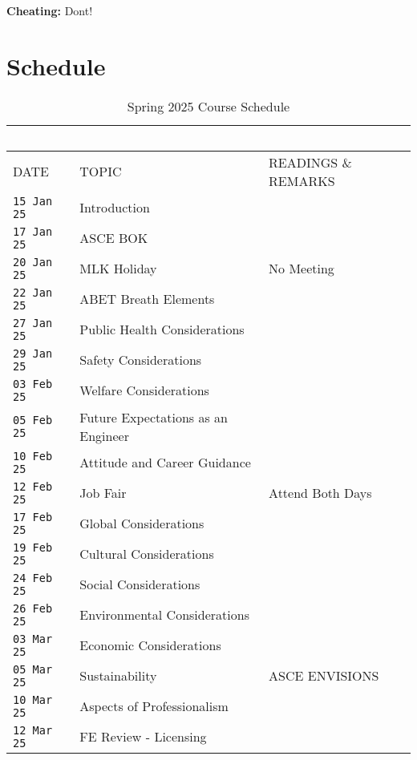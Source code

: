 \documentclass[12pt]{article}
\begin{document}
\textbf{Cheating:} Dont!


\clearpage
\section*{Schedule}
\begin{table}[ht!]
   \centering
   \caption{Spring 2025 Course Schedule}
   \begin{tabular}{p{1.0in}p{2.5in}p{3.0in}} 
   ~ & ~ & ~  \\
\hline
DATE & TOPIC & READINGS \& REMARKS  \\
\hline
\texttt{15 Jan 25} & Introduction &   \\ %
\texttt{17 Jan 25} & ASCE BOK &  \cite{ASCE2019}\\ %
\texttt{20 Jan 25} & MLK Holiday & No Meeting \\%
\texttt{22 Jan 25} & ABET Breath Elements & \cite{ASCE2019} \\%
\texttt{27 Jan 25} & Public Health Considerations &  \cite{ASCE2019} \\ %
\texttt{29 Jan 25} & Safety Considerations &  \cite{ASCE2019} \\ %
\texttt{03 Feb 25} & Welfare Considerations &  \cite{ASCE2019} \\ %
\texttt{05 Feb 25} & Future Expectations as an Engineer & \\ %
\texttt{10 Feb 25} & Attitude and Career Guidance &  \cite{Attitude2024} \\ %
\texttt{12 Feb 25} & Job Fair &  Attend Both Days \\ %
\texttt{17 Feb 25} & Global Considerations &  \cite{ASCE2019} \\ %
\texttt{19 Feb 25} & Cultural Considerations &  \cite{ASCE2019} \\ %
\texttt{24 Feb 25} & Social Considerations &  \cite{ASCE2019} \\ %
\texttt{26 Feb 25} & Environmental Considerations &  \cite{ASCE2019} \\ %
\texttt{03 Mar 25} & Economic Considerations &  \cite{ASCE2019} \\ %
\texttt{05 Mar 25} & Sustainability & ASCE ENVISIONS \cite{ASCE2019} \\ %
\hline
\texttt{10 Mar 25} & Aspects of Professionalism   &  \cite{Lawson2004}\\ %
\texttt{12 Mar 25} & FE Review - Licensing & \cite{TEPA2021}\\ %

\end{tabular}
\end{table}
\end{document}

